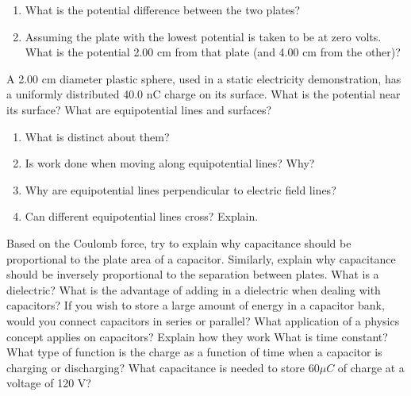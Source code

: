 \documentclass[12pt,addpoints]{exam}
\begin{document}
\begin{questions}
\begin{enumerate}[label=(\roman*)]
			\item What is the potential difference between the two plates?\vspace{1.5in}
			\item Assuming the plate with the lowest potential is taken to be at zero volts. What is the potential 2.00 cm from that plate (and 4.00 cm from the other)?\vspace{1.5in}
		\end{enumerate}
		\question A 2.00 cm diameter plastic sphere, used in a static electricity demonstration, has a uniformly distributed 40.0 nC charge on its surface. What is the potential near its surface?\vspace{1.5in}
		\question What are equipotential lines and surfaces? \vspace{1.5in}
		\begin{enumerate}[label=(\roman*)]
			\item What is distinct about them?\vspace{1in}
			\item Is work done when moving along equipotential lines? Why? \vspace{1.5in}
			\item Why are equipotential lines perpendicular to electric field lines?\vspace{1.5in}
			\item Can different equipotential lines cross? Explain.\vspace{1in}
		\end{enumerate}  
		\question Based on the Coulomb force, try to explain why capacitance should be proportional to the plate area of a
		capacitor. Similarly, explain why capacitance should be inversely proportional to the separation between plates. \vspace{1.5in}
		\question What is a dielectric? What is the advantage of adding in a dielectric when dealing with capacitors?\vspace{1.5in}
		\question If you wish to store a large amount of energy in a capacitor bank, would you connect capacitors in series or parallel?\vspace{1.5in}
		\question What application of a physics concept applies on capacitors? Explain how they work \vspace{1.5in}
		\question What is time constant? What type of function is the charge as a function of time when a capacitor is charging or discharging?\vspace{1.5in}
		\question What capacitance is needed to store $60\mu C$ of charge at a voltage of 120 V?\vspace{1.5in}

\end{questions}
\end{document}
